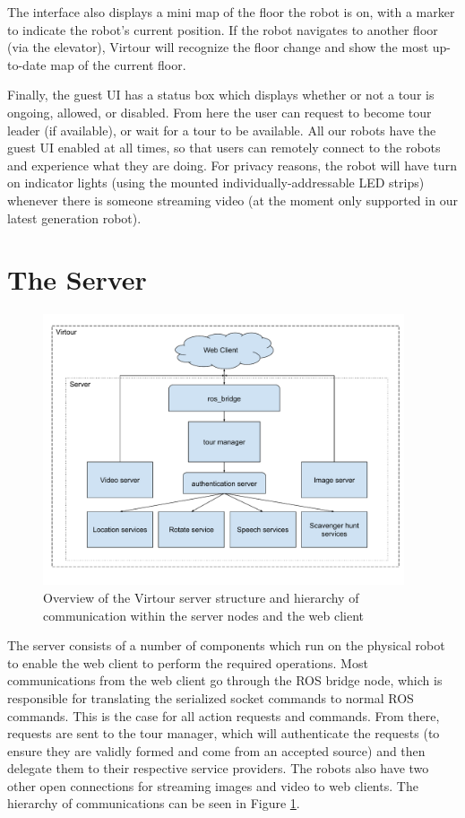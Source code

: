 \documentclass[
  oneside,
  11pt, a4paper,
  footinclude=true,
  headinclude=true,
  cleardoublepage=empty
]{article}
\begin{document}
The interface also displays a mini map of the floor the robot is
on, with a marker to indicate the robot's current position.  If the
robot navigates to another floor (via the elevator), Virtour will recognize the
floor change and show the most up-to-date map of the current floor.

Finally, the guest UI has a status box which displays whether or not a tour is
ongoing, allowed, or disabled. From here the user can request to become tour
leader (if available), or wait for a tour to be available. All our robots have
the guest UI enabled at all times, so that users can remotely connect to the
robots and experience what they are doing. For privacy reasons, the robot will
have turn on indicator lights (using the mounted individually-addressable LED
strips) whenever there is someone streaming video (at the moment only supported
in our latest generation robot).


\section{The Server}\label{sec:server}

\begin{figure}
  \centering
  \includegraphics[width=0.95\textwidth]{virtour_server}
  \caption{Overview of the Virtour server structure and hierarchy of
  communication within the server nodes and the web client}
  \label{fig:server}
\end{figure}

The server consists of a number of components which run on the physical robot
to enable the web client to perform the required operations. Most communications
from the web client go through the ROS bridge node, which is responsible
for translating the serialized socket commands to normal ROS commands. This is
the case for all action requests and commands. From there, requests are
sent to the tour manager, which will authenticate the requests (to ensure they
are validly formed and come from an accepted source) and then delegate them to
their respective service providers. The robots also have two other open
connections for streaming images and video to web clients. The hierarchy of
communications can be seen in Figure \ref{fig:server}.
\end{document}
